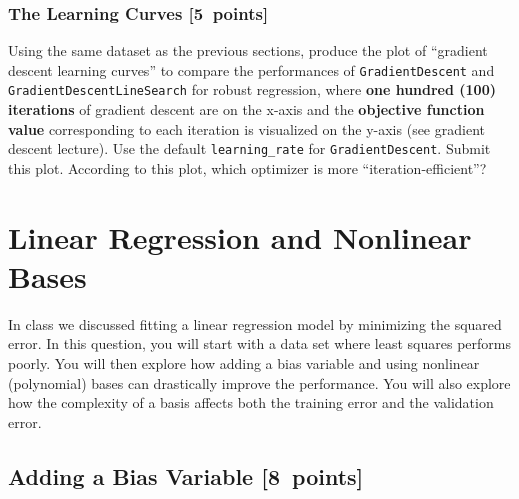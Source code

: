 \documentclass{article}
\newcommand{\blu}[1]{{\textcolor{blu}{#1}}}
\let\ask\blu
\newcommand\pts[1]{\textcolor{pointscolour}{[#1~points]}}
\begin{document}
\subsubsection{The Learning Curves \pts{5}}

Using the same dataset as the previous sections, produce the plot of ``gradient descent learning curves'' to compare the performances of \texttt{GradientDescent} and \texttt{GradientDescentLineSearch} for robust regression, where \textbf{one hundred (100) iterations} of gradient descent are on the x-axis and the \textbf{objective function value} corresponding to each iteration is visualized on the y-axis (see gradient descent lecture). Use the default \texttt{learning\_rate} for \texttt{GradientDescent}. \ask{Submit this plot. According to this plot, which optimizer is more ``iteration-efficient''?}



\clearpage
\section{Linear Regression and Nonlinear Bases}

In class we discussed fitting a linear regression model by minimizing the squared error.
In this question, you will start with a data set where least squares performs poorly.
You will then explore how adding a bias variable and using nonlinear (polynomial) bases can drastically improve the performance.
You will also explore how the complexity of a basis affects both the training error and the validation error.

\subsection{Adding a Bias Variable \pts{8}}
\end{document}

